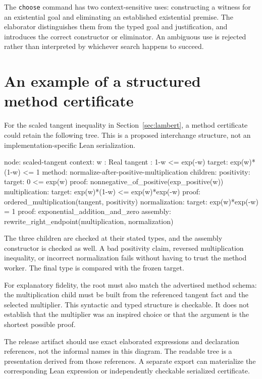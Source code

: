 \documentclass[11pt,a4paper]{article}
\newcommand{\codeid}[1]{\nolinkurl{#1}}
\begin{document}
The \codeid{choose} command has two context-sensitive uses: constructing a witness for an existential goal and eliminating an established existential premise. The elaborator distinguishes them from the typed goal and justification, and introduces the correct constructor or eliminator. An ambiguous use is rejected rather than interpreted by whichever search happens to succeed.

\section{An example of a structured method certificate}
\label{app:certificate}

For the scaled tangent inequality in Section~\ref{sec:lambert}, a method certificate could retain the following tree. This is a proposed interchange structure, not an implementation-specific Lean serialization.

\par\noindent\begin{minipage}{\linewidth}
\begin{rawcode}
node: scaled-tangent
context:
  w : Real
  tangent : 1-w <= exp(-w)
target:
  exp(w)*(1-w) <= 1
method:
  normalize-after-positive-multiplication
children:
  positivity:
    target: 0 <= exp(w)
    proof: nonnegative_of_positive(exp_positive(w))
  multiplication:
    target: exp(w)*(1-w) <= exp(w)*exp(-w)
    proof: ordered_multiplication(tangent, positivity)
  normalization:
    target: exp(w)*exp(-w) = 1
    proof: exponential_addition_and_zero
assembly:
  rewrite_right_endpoint(multiplication, normalization)
\end{rawcode}
\end{minipage}\par

The three children are checked at their stated types, and the assembly constructor is checked as well. A bad positivity claim, reversed multiplication inequality, or incorrect normalization fails without having to trust the method worker. The final type is compared with the frozen target.

For explanatory fidelity, the root must also match the advertised method schema: the multiplication child must be built from the referenced tangent fact and the selected multiplier. This syntactic and typed structure is checkable. It does not establish that the multiplier was an inspired choice or that the argument is the shortest possible proof.

The release artifact should use exact elaborated expressions and declaration references, not the informal names in this diagram. The readable tree is a presentation derived from those references. A separate export can materialize the corresponding Lean expression or independently checkable serialized certificate.
\end{document}
